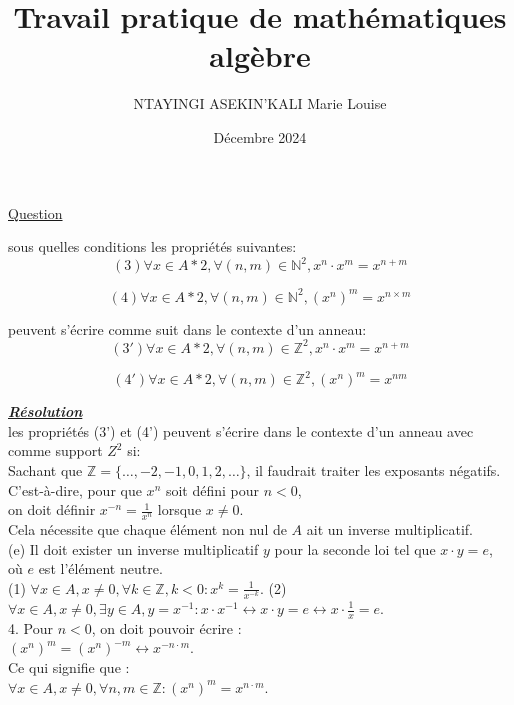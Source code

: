 \documentclass{article}
\title{Travail pratique de mathématiques algèbre}
\author{NTAYINGI ASEKIN'KALI Marie Louise }
\date{Décembre 2024}
\begin{document}
\maketitle
\pagestyle{empty}
\underline{Question}

sous quelles conditions les propriétés suivantes:
\[
(3) \forall x \in A*2, \forall (n,m) \in \mathbb{N}^2, x^n \cdot x^m = x^{n+m}\]

\[
(4) \forall x \in A*2, \forall (n,m) \in \mathbb{N}^2, (x^n)^m= x^{n \times m}\]

peuvent s'écrire comme suit dans le contexte d'un anneau:\\
\[
(3') \forall x \in A*2, \forall (n,m) \in \mathbb{Z}^2, x^n \cdot x^m = x^{n+m}\]

\[
(4') \forall x \in A*2, \forall (n,m) \in \mathbb{Z}^2, (x^n)^m = x^{nm}\]

\underline{\textbf{\textit{Résolution}}}\\ 

les propriétés (3') et (4') peuvent s'écrire dans le contexte d'un anneau avec comme support \(Z^2\) si:\\
Sachant que \( \mathbb{Z} = \{ \ldots, -2, -1, 0, 1, 2, \ldots \} \), il faudrait traiter les exposants négatifs.\\
C'est-à-dire, pour que \( x^n \) soit défini pour \( n < 0 \),\\
on doit définir \( x^{-n} = \frac{1}{x^n} \) lorsque \( x \neq 0 \).\\
Cela nécessite que chaque élément non nul de \( A \) ait un inverse multiplicatif.\\

(e) Il doit exister un inverse multiplicatif \( y \) pour la seconde loi tel que \( x \cdot y = e \), où \( e \) est l'élément neutre.\\

(1) \(\forall x \in A, x \neq 0, \forall k \in \mathbb{Z}, k < 0: x^k = \frac{1}{x^{-k}} \).
(2) \(\forall x \in A, x \neq 0, \exists y \in A, y = x^{-1} : x \cdot x^{-1} \leftrightarrow x \cdot y = e \leftrightarrow x \cdot \frac{1}{x} = e.\)\\

4. Pour \(n < 0\), on doit pouvoir écrire :\\
\((x^n)^m = (x^n)^{-m} \leftrightarrow x^{-n \cdot m}.\)\\
Ce qui signifie que :\\
\(\forall x \in A, x \neq 0, \forall n, m \in \mathbb{Z} : (x^n)^m = x^{n \cdot m}.\)\\
\end{document}

